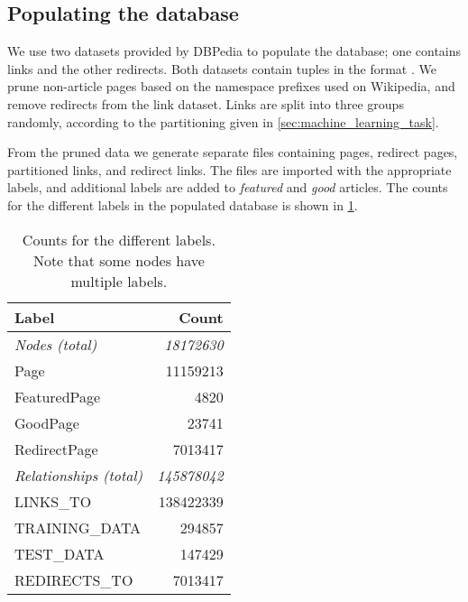 \subsection{Populating the database} \label{sec:db_populate}
We use two datasets provided by DBPedia to populate the database; one contains links and the other redirects. Both datasets contain tuples in the format .  We prune non-article pages based on the namespace prefixes used on Wikipedia, and remove redirects from the link dataset. Links are split into three groups randomly, according to the partitioning given in \cref{sec:machine_learning_task}. 

From the pruned data we generate separate files containing pages, redirect pages, partitioned links, and redirect links. The files are imported with the appropriate labels, and additional labels are added to \emph{featured} and \emph{good} articles.
 The counts for the different labels in the populated database is shown in \cref{tab:db_counts}.

\begin{table}[tbp]
\centering
\begin{tabular}{@{}lr@{}}
\toprule
\textbf{Label}         & \textbf{Count}     \\ \midrule
\textit{Nodes (total)} & \textit{18172630}  \\
Page                   & 11159213           \\
FeaturedPage           & 4820               \\
GoodPage               & 23741              \\
RedirectPage           & 7013417            \\ \midrule
\textit{Relationships (total)} & \textit{145878042} \\
LINKS\_TO              & 138422339          \\
TRAINING\_DATA         & 294857             \\
TEST\_DATA             & 147429             \\
REDIRECTS\_TO          & 7013417            \\ \bottomrule
\end{tabular}
\caption[Counts for the different labels]{Counts for the different labels. Note that some nodes have multiple labels.}
\label{tab:db_counts}
\end{table}
